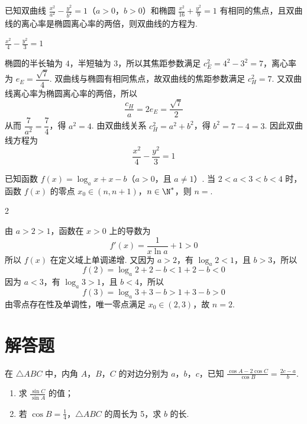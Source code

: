 \begin{problem}
已知双曲线 \(\frac{x^2}{a^2} - \frac{y^2}{b^2} = 1\)（\(a > 0\)，\(b > 0\)）和椭圆 \(\frac{x^2}{16} + \frac{y^2}{9} = 1\) 有相同的焦点，且双曲线的离心率是椭圆离心率的两倍，则双曲线的方程为\fillinblank{}.
\end{problem}

\begin{answer}
\(\frac{x^2}{4} - \frac{y^2}{3} = 1\)
\end{answer}

\begin{solution}
椭圆的半长轴为 \(4\)，半短轴为 \(3\)，所以其焦距参数满足 \(c_E^2=4^2-3^2=7\)，离心率为 \(e_E=\dfrac{\sqrt7}{4}\). 双曲线与椭圆有相同焦点，故双曲线的焦距参数满足 \(c_H^2=7\). 又双曲线离心率为椭圆离心率的两倍，所以
\[
\frac{c_H}{a}=2e_E=\frac{\sqrt7}{2}
\]
从而 \(\dfrac{7}{a^2}=\dfrac74\)，得 \(a^2=4\). 由双曲线关系 \(c_H^2=a^2+b^2\)，得 \(b^2=7-4=3\). 因此双曲线方程为
\[
\frac{x^2}{4}-\frac{y^2}{3}=1
\]
\end{solution}

\begin{problem}
已知函数 \(f(x) = \log_a x + x - b\)（\(a > 0\)，且 \(a \neq 1\)）. 当 \(2 < a < 3 < b < 4\) 时，函数 \(f(x)\) 的零点 \(x_0 \in (n, n + 1)\)，\(n \in \N^*\)，则 \(n = \)\fillinblank{}.
\end{problem}

\begin{answer}
2
\end{answer}

\begin{solution}
由 \(a>2>1\)，函数在 \(x>0\) 上的导数为
\[
f'(x)=\frac{1}{x\ln a}+1>0
\]
所以 \(f(x)\) 在定义域上单调递增. 又因为 \(a>2\)，有 \(\log_a2<1\)，且 \(b>3\)，所以
\[
f(2)=\log_a2+2-b<1+2-b<0
\]
因为 \(a<3\)，有 \(\log_a3>1\)，且 \(b<4\)，所以
\[
f(3)=\log_a3+3-b>1+3-b>0
\]
由零点存在性及单调性，唯一零点满足 \(x_0\in(2,3)\)，故 \(n=2\).
\end{solution}

\section{解答题}

\begin{problem}
在 \(\triangle ABC\) 中，内角 \(A\)，\(B\)，\(C\) 的对边分别为 \(a\)，\(b\)，\(c\)，已知 \(\frac{\cos A - 2\cos C}{\cos B} = \frac{2c - a}{b}\).
\begin{enumerate}
\item 求 \( \frac{\sin C}{\sin A} \) 的值；
\item 若 \( \cos B = \frac{1}{4} \)，\( \triangle ABC \) 的周长为 5，求 \(b\) 的长.
\end{enumerate}
\end{problem}


